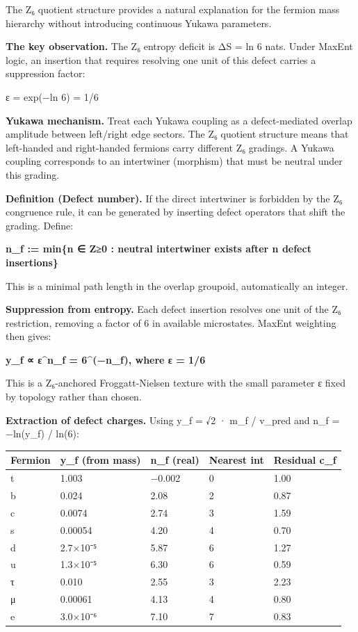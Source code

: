 \documentclass[
]{article}
\newcounter{none} %
\begin{document}
The Z₆ quotient structure provides a natural explanation for the fermion
mass hierarchy without introducing continuous Yukawa parameters.

\textbf{The key observation.} The Z₆ entropy deficit is ΔS = ln 6 nats.
Under MaxEnt logic, an insertion that requires resolving one unit of
this defect carries a suppression factor:

ε = exp(−ln 6) = 1/6

\textbf{Yukawa mechanism.} Treat each Yukawa coupling as a
defect-mediated overlap amplitude between left/right edge sectors. The
Z₆ quotient structure means that left-handed and right-handed fermions
carry different Z₆ gradings. A Yukawa coupling corresponds to an
intertwiner (morphism) that must be neutral under this grading.

\textbf{Definition (Defect number).} If the direct intertwiner is
forbidden by the Z₆ congruence rule, it can be generated by inserting
defect operators that shift the grading. Define:

\textbf{n\_f := min\{n ∈ Z≥0 : neutral intertwiner exists after n defect
insertions\}}

This is a minimal path length in the overlap groupoid, automatically an
integer.

\textbf{Suppression from entropy.} Each defect insertion resolves one
unit of the Z₆ restriction, removing a factor of 6 in available
microstates. MaxEnt weighting then gives:

\textbf{y\_f ∝ ε\^{}n\_f = 6\^{}(−n\_f), where ε = 1/6}

This is a Z₆-anchored Froggatt-Nielsen texture with the small parameter
ε fixed by topology rather than chosen.

\textbf{Extraction of defect charges.} Using y\_f = √2 · m\_f / v\_pred
and n\_f = −ln(y\_f) / ln(6):

{\def\LTcaptype{none} %
\begin{longtable}[]{@{}lllll@{}}
\toprule\noalign{}
Fermion & y\_f (from mass) & n\_f (real) & Nearest int & Residual
c\_f \\
\midrule\noalign{}
\endhead
\bottomrule\noalign{}
\endlastfoot
t & 1.003 & −0.002 & 0 & 1.00 \\
b & 0.024 & 2.08 & 2 & 0.87 \\
c & 0.0074 & 2.74 & 3 & 1.59 \\
s & 0.00054 & 4.20 & 4 & 0.70 \\
d & 2.7×10⁻⁵ & 5.87 & 6 & 1.27 \\
u & 1.3×10⁻⁵ & 6.30 & 6 & 0.59 \\
τ & 0.010 & 2.55 & 3 & 2.23 \\
μ & 0.00061 & 4.13 & 4 & 0.80 \\
e & 3.0×10⁻⁶ & 7.10 & 7 & 0.83 \\
\end{longtable}
}
\end{document}

